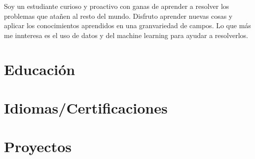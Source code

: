 \documentclass[10pt]{article} %
\begin{document}
Soy un estudiante curioso y proactivo con ganas de aprender a resolver los problemas que atañen al resto del mundo. Disfruto aprender nuevas cosas y aplicar los conocimientos aprendidos en una granvariedad de campos. Lo que más me innteresa es el uso de datos y del machine learning para ayudar a resolverlos.

\vspace{-5mm}

\section{Educación}


\vspace{-5mm}
\section{Idiomas/Certificaciones}

\vspace{-5mm}
\section{Proyectos}
\end{document}
